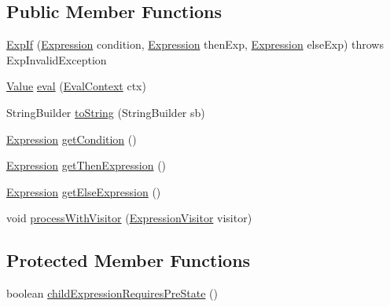 \subsection*{Public Member Functions}
\begin{DoxyCompactItemize}
\item 
\hyperlink{classorg_1_1tzi_1_1use_1_1uml_1_1ocl_1_1expr_1_1_exp_if_ad3c66daf1ae63f54e37d1cb4c075cf43}{Exp\-If} (\hyperlink{classorg_1_1tzi_1_1use_1_1uml_1_1ocl_1_1expr_1_1_expression}{Expression} condition, \hyperlink{classorg_1_1tzi_1_1use_1_1uml_1_1ocl_1_1expr_1_1_expression}{Expression} then\-Exp, \hyperlink{classorg_1_1tzi_1_1use_1_1uml_1_1ocl_1_1expr_1_1_expression}{Expression} else\-Exp)  throws Exp\-Invalid\-Exception     
\item 
\hyperlink{classorg_1_1tzi_1_1use_1_1uml_1_1ocl_1_1value_1_1_value}{Value} \hyperlink{classorg_1_1tzi_1_1use_1_1uml_1_1ocl_1_1expr_1_1_exp_if_a269c1f0c4e79f2d7392f5c33970eb1ce}{eval} (\hyperlink{classorg_1_1tzi_1_1use_1_1uml_1_1ocl_1_1expr_1_1_eval_context}{Eval\-Context} ctx)
\item 
String\-Builder \hyperlink{classorg_1_1tzi_1_1use_1_1uml_1_1ocl_1_1expr_1_1_exp_if_a3bd746203075c99f2ca7bb75227fee6f}{to\-String} (String\-Builder sb)
\item 
\hyperlink{classorg_1_1tzi_1_1use_1_1uml_1_1ocl_1_1expr_1_1_expression}{Expression} \hyperlink{classorg_1_1tzi_1_1use_1_1uml_1_1ocl_1_1expr_1_1_exp_if_aab75e6a571309790cb0ae6800f1ccc33}{get\-Condition} ()
\item 
\hyperlink{classorg_1_1tzi_1_1use_1_1uml_1_1ocl_1_1expr_1_1_expression}{Expression} \hyperlink{classorg_1_1tzi_1_1use_1_1uml_1_1ocl_1_1expr_1_1_exp_if_ae77e74f97061c565fa242b37c9117548}{get\-Then\-Expression} ()
\item 
\hyperlink{classorg_1_1tzi_1_1use_1_1uml_1_1ocl_1_1expr_1_1_expression}{Expression} \hyperlink{classorg_1_1tzi_1_1use_1_1uml_1_1ocl_1_1expr_1_1_exp_if_a2f498baa999878fed96ceedb23952a5f}{get\-Else\-Expression} ()
\item 
void \hyperlink{classorg_1_1tzi_1_1use_1_1uml_1_1ocl_1_1expr_1_1_exp_if_ad14b73758232b5664bbe62d6cd41d8c3}{process\-With\-Visitor} (\hyperlink{interfaceorg_1_1tzi_1_1use_1_1uml_1_1ocl_1_1expr_1_1_expression_visitor}{Expression\-Visitor} visitor)
\end{DoxyCompactItemize}
\subsection*{Protected Member Functions}
\begin{DoxyCompactItemize}
\item 
boolean \hyperlink{classorg_1_1tzi_1_1use_1_1uml_1_1ocl_1_1expr_1_1_exp_if_af75a30ad03dee06150474236f9a1c2d8}{child\-Expression\-Requires\-Pre\-State} ()
\end{DoxyCompactItemize}


